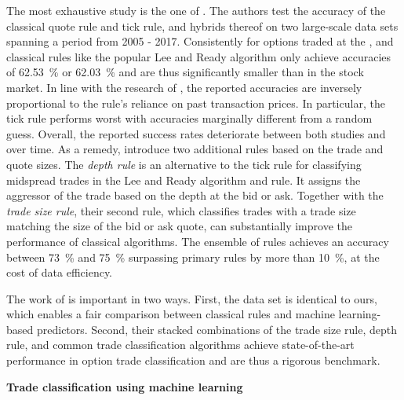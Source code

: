 The most exhaustive study is the one of \textcite[1--39]{grauerOptionTradeClassification2022}.  The authors test the accuracy of the classical quote rule and tick rule, and hybrids thereof on two large-scale data sets spanning a period from 2005 - 2017. Consistently for options traded at the , and  classical rules like the popular Lee and Ready algorithm only achieve accuracies of \SI{62.53}{\percent} or \SI{62.03}{\percent} and are thus significantly smaller than in the stock market. In line with the research of  \textcite[886]{savickasInferringDirectionOption2003}, the reported accuracies are inversely proportional to the rule's reliance on past transaction prices. In particular, the tick rule performs worst with accuracies marginally different from a random guess. Overall, the reported success rates deteriorate between both studies and over time. As a remedy, \textcite[14--17]{grauerOptionTradeClassification2022} introduce two additional rules based on the trade and quote sizes. The \textit{depth rule} is an alternative to the tick rule for classifying midspread trades in the Lee and Ready algorithm and  rule. It assigns the aggressor of the trade based on the depth at the bid or ask. Together with the \textit{trade size rule}, their second rule, which classifies trades with a trade size matching the size of the bid or ask quote, can substantially improve the performance of classical algorithms. The ensemble of rules achieves an accuracy between \SI{73}{\percent} and \SI{75}{\percent} surpassing primary rules by more than \SI{10}{\percent}, at the cost of data efficiency.

The work of \textcite[1--39]{grauerOptionTradeClassification2022} is important in two ways. First, the data set is identical to ours, which enables a fair comparison between classical rules and machine learning-based predictors. Second, their stacked combinations of the trade size rule, depth rule, and common trade classification algorithms achieve state-of-the-art performance in option trade classification and are thus a rigorous benchmark.

\textbf{Trade classification using machine learning}

